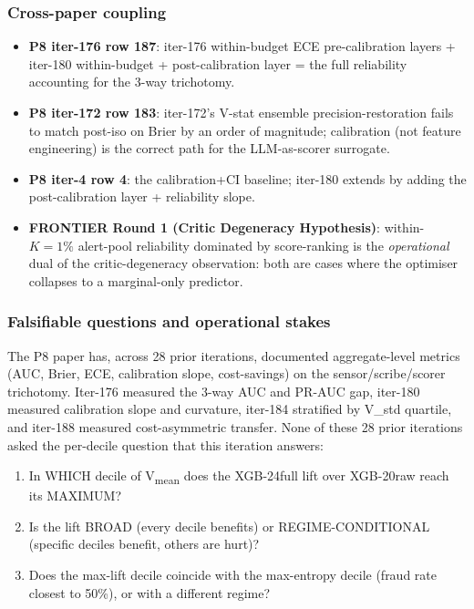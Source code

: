 \documentclass{article}
\begin{document}
\subsubsection{Cross-paper coupling}
\begin{itemize}
\item \textbf{P8 iter-176 row 187}: iter-176 within-budget ECE
  pre-calibration layers + iter-180 within-budget + post-calibration
  layer = the full reliability accounting for the 3-way trichotomy.
\item \textbf{P8 iter-172 row 183}: iter-172's V-stat ensemble
  precision-restoration fails to match post-iso on Brier by an
  order of magnitude; calibration (not feature engineering) is the
  correct path for the LLM-as-scorer surrogate.
\item \textbf{P8 iter-4 row 4}: the calibration+CI baseline; iter-180
  extends by adding the post-calibration layer + reliability slope.
\item \textbf{FRONTIER Round 1 (Critic Degeneracy Hypothesis)}:
  within-$K{=}1\%$ alert-pool reliability dominated by score-ranking
  is the \emph{operational} dual of the critic-degeneracy
  observation: both are cases where the optimiser collapses to a
  marginal-only predictor.
\end{itemize}
 

\subsubsection{Falsifiable questions and operational stakes}\label{sec:p8-iter192-decile}
The P8 paper has, across 28 prior iterations, documented aggregate-level
metrics (AUC, Brier, ECE, calibration slope, cost-savings) on the
sensor/scribe/scorer trichotomy. Iter-176 measured the 3-way AUC and PR-AUC
gap, iter-180 measured calibration slope and curvature, iter-184 stratified
by V_std quartile, and iter-188 measured cost-asymmetric transfer. None of
these 28 prior iterations asked the per-decile question that this iteration
answers:

\begin{enumerate}
\item In WHICH decile of V\textsubscript{mean} does the
  XGB-24full lift over XGB-20raw reach its MAXIMUM?
\item Is the lift BROAD (every decile benefits) or REGIME-CONDITIONAL
  (specific deciles benefit, others are hurt)?
\item Does the max-lift decile coincide with the max-entropy decile
  (fraud rate closest to 50\%), or with a different regime?
\end{enumerate}
\end{document}
